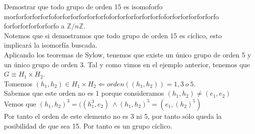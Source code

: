 \documentclass[nochap]{apuntes}
\begin{document}
  \begin{example}
   Demostrar que todo grupo de orden 15 es isomoforfo morforforforforfo{\large forforforforforforfo{\LARGE forforforforforforfo{\huge forforforforforforfo {\Huge forforforforforforfo}}}} %
   a $\mathbb{Z}/n\mathbb{Z}$.\\
   Notemos que si demostramos que todo grupo de orden 15 es cíclico, esto implicará la isomorfía buscada.\\
   Aplicando los teoremas de Sylow, tenemos que existe un único grupo de orden 5 y un único grupo de orden 3. Tal y como vimos en el 
   ejemplo anterior, tenemos que $G\equiv H_1\times H_2$.\\
   Tomemos $(h_1, h_2)\in H_1 \times H_2 \Leftarrow orden((h_1, h_2))=1,3\ o \ 5$.\\
   Sabemos que este orden no es 1 porque consideramos  $(h_1, h_2)\neq (e_1, e_2)$\\
   Vemos que $(h_1, h_2)^{3}=((h_1^{3}, e_2) \ \wedge (h_1, h_2)^{5}=(e_1, (h_2)^{5})$\\
   Por tanto el orden de este elemento no es 3 ni 5, por tanto sólo queda la posibilidad de que sea 15. Por tanto es un grupo cíclico.
  \end{example}

\newpage
\printindex
\end{document}
